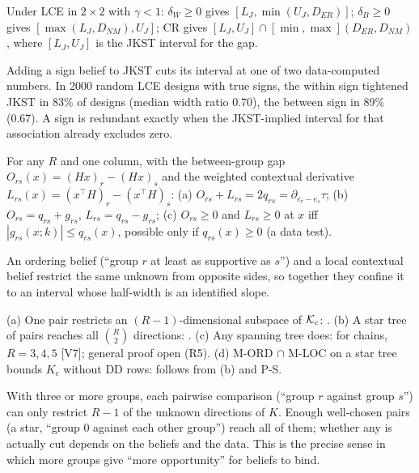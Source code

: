 \begin{result}\label{res:g2}
 Under LCE in $2\times2$ with $\gamma<1$: $\delta_W\ge0$ gives
$[L_J,\min(U_J,D_{ER})]$; $\delta_B\ge0$ gives $[\max(L_J,D_{NM}),U_J]$; CR gives
$[L_J,U_J]\cap[\min,\max](D_{ER},D_{NM})$, where $[L_J,U_J]$ is the JKST interval
for the gap.
\end{result}
\begin{plain}
Adding a sign belief to JKST cuts its interval at one of two data-computed
numbers. In 2000 random LCE designs with true signs, the within sign tightened
JKST in 83\% of designs (median width ratio 0.70), the between sign in 89\%
(0.67). A sign is redundant exactly when the JKST-implied interval for that
association already excludes zero.
\end{plain}

\begin{result}\label{res:ps}
 For any $R$ and one column, with the between-group gap
$O_{rs}(x)=(Hx)_r-(Hx)_s$ and the weighted contextual derivative
$L_{rs}(x)=(x^\top H)_r-(x^\top H)_s$: (a) $O_{rs}+L_{rs}=2q_{rs}=\partial_{e_r-e_s}\tau$;
(b) $O_{rs}=q_{rs}+g_{rs}$, $L_{rs}=q_{rs}-g_{rs}$; (c) $O_{rs}\ge0$ and
$L_{rs}\ge0$ at $x$ iff $|g_{rs}(x;k)|\le q_{rs}(x)$, possible only if
$q_{rs}(x)\ge0$ (a data test).
\end{result}
\begin{plain}
An ordering belief (``group $r$ at least as supportive as $s$'') and a local
contextual belief restrict the same unknown from opposite sides, so together
they confine it to an interval whose half-width is an identified slope.
\end{plain}

\begin{result}\label{res:pr}
(a) One pair restricts an $(R-1)$-dimensional subspace of $\mathcal K_c$: .
(b) A star tree of pairs reaches all $\binom R2$ directions: .
(c) Any spanning tree does:  for chains, $R=3,4,5$ [V7];
general proof open (R5). (d) M-ORD $\cap$ M-LOC on a star tree bounds $K_c$ without
DD rows: follows from (b) and P-S.
\end{result}
\begin{plain}
With three or more groups, each pairwise comparison (``group $r$ against group
$s$'') can only restrict $R-1$ of the unknown directions of $K$. Enough well-chosen
pairs (a star, ``group 0 against each other group'') reach all of them; whether
any is actually cut depends on the beliefs and the data. This is the precise
sense in which more groups give ``more opportunity'' for beliefs to bind.
\end{plain}

